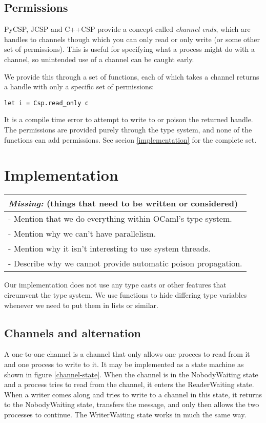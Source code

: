 \documentclass[a4paper,12pt]{article}
\newcommand{\missing}[1]{
  \begin{tabular}{|p{11cm}|}
    \hline
    \emph{Missing:} {\scriptsize (things that need to be written or considered)} \\
    \hline
    #1
    \hline
  \end{tabular}
}
\begin{document}
\subsection{Permissions}

PyCSP, JCSP and C++CSP provide a concept called \emph{channel ends}, which are
handles to channels though which you can only read or only write (or some other
set of permissions). This is useful for specifying what a process might do with
a channel, so unintended use of a channel can be caught early.

We provide this through a set of functions, each of which takes a channel
returns a handle with only a specific set of permissions:

\begin{verbatim}
let i = Csp.read_only c
\end{verbatim}

It is a compile time error to attempt to write to or poison the returned handle.
The permissions are provided purely through the type system, and none of the
functions can add permissions. See secion \ref{implementation} for the complete
set.

\section{Implementation}
\missing{
- Mention that we do everything within OCaml's type system.\\
- Mention why we can't have parallelism.\\
- Mention why it isn't interesting to use system threads.\\
- Describe why we cannot provide automatic poison propagation.\\
}
\label{implementation}

Our implementation does not use any type casts or other features that
circumvent the type system. We use functions to hide differing type variables
whenever we need to put them in lists or similar.

\subsection{Channels and alternation}
A one-to-one channel is a channel that only allows one procees to read from it
and one process 
to write to it. It may be implemented as a state machine as shown in figure \ref{channel-state}.
When the channel is in the NobodyWaiting state and a process tries to read from the channel,
it enters the ReaderWaiting state. When a writer comes along and tries to write to a channel
in this state, it returns to the NobodyWaiting state, transfers the message, and only then
allows the two processes to continue. The WriterWaiting state works in much the same way.
\end{document}
